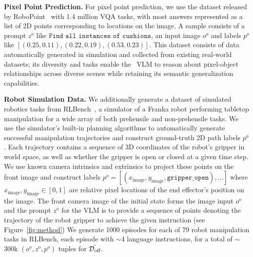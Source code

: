 \textbf{Pixel Point Prediction.} For pixel point prediction, we use the dataset released by RoboPoint~\citep{yuan2024robopoint} with 1.4 million VQA tasks, with most answers represented as a list of 2D points corresponding to locations on the image. A sample consists of a prompt $z^o$ like $\texttt{Find all instances of cushions}$, an input image $o^o$ and labels $p^o$ like \texttt{$[(0.25, 0.11), (0.22, 0.19), (0.53, 0.23)]$}.
This dataset consists of data automatically generated in simulation and collected from existing real-world datasets; its diversity and tasks enable the \method\ VLM to reason about pixel-object relationships across diverse scenes while retaining its semantic generalization capabilities.

\textbf{Robot Simulation Data.} We additionally generate a dataset of simulated robotics tasks from RLBench~\citep{james2020rlbench}, a simulator of a Franka robot performing tabletop manipulation for a wide array of both prehensile and non-prehensile tasks.
We use the simulator's built-in planning algorithms to automatically generate successful manipulation trajectories and construct ground-truth 2D path labels $p^o$.
Each trajectory contains a sequence of 3D coordinates of the robot's gripper in world space, as well as whether the gripper is open or closed at a given time step. 
We use known camera intrinsics and extrinsics to project these points on the front image and construct labels $p^o = [(x_\text{image}, y_\text{image}, \texttt{gripper\_open}), \ldots]$ where $x_\text{image}, y_\text{image} \in [0, 1]$ are relative pixel locations of the end effector's position on the image.
The front camera image of the initial state forms the image input $o^o$ and the prompt $z^o$ for the VLM is to provide a sequence of points denoting the trajectory of the robot gripper to achieve the given instruction (see Figure~\ref{fig:method})
We generate 1000 episodes for each of 79 robot manipulation tasks in RLBench, each episode with $\sim$4 language instructions, for a total of $\sim$300k $(o^o, z^o, p^o) $ tuples for $\Tilde{\mathcal{D}_\text{off}}$.

